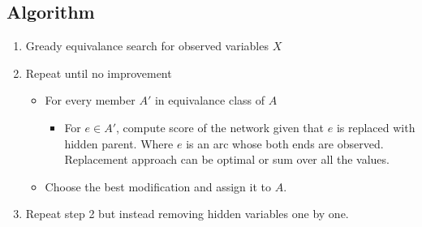 \documentclass[]{article}
\begin{document}
\subsection{Algorithm}
\begin{enumerate}
	\item Gready equivalance search for observed variables $X$
	\item Repeat until no improvement
		\begin{itemize}
		\item For every member $A'$ in equivalance class of $A$
		\begin{itemize}
			\item For $e \in A'$, compute score of the network given that $e$ is replaced with hidden parent. Where $e$ is an arc whose both ends are observed. Replacement approach can be optimal or sum over all the values. 
		\end{itemize}
		\item Choose the best modification and assign it to $A$.		
		\end{itemize}
	\item Repeat step 2 but instead removing hidden variables one by one.
\end{enumerate}




\end{document}
